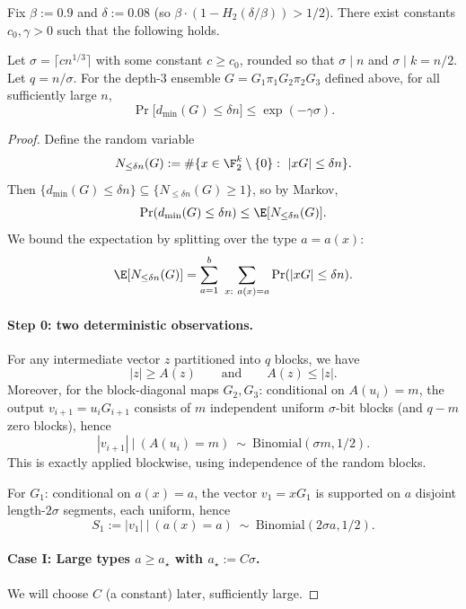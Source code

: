 \begin{theorem}[Linear distance for $t=3$, rate $1/2$]\label{thm:bd_t3_full}
Fix $\beta:=0.9$ and $\delta:=0.08$ (so $\beta\cdot(1-H_2(\delta/\beta))>1/2$).
There exist constants $c_0,\gamma>0$ such that the following holds.

Let $\sigma=\lceil c n^{1/3}\rceil$ with some constant $c\ge c_0$, rounded so that $\sigma\mid n$ and $\sigma\mid k=n/2$.
Let $q=n/\sigma$.
For the depth-$3$ ensemble $G=G_1\pi_1G_2\pi_2G_3$ defined above,
for all sufficiently large $n$,
\[
\Pr\bigl[d_{\min}(G)\le \delta n\bigr]\le \exp(-\gamma \sigma).
\]
\end{theorem}

\begin{proof}
Define the random variable
\[
N_{\le \delta n}(G):=\#\{x\in\F_2^k\setminus\{0\}:\ |xG|\le \delta n\}.
\]
Then $\{d_{\min}(G)\le \delta n\}\subseteq\{N_{\le\delta n}(G)\ge 1\}$, so by Markov,
\[
\Pr(d_{\min}(G)\le \delta n)\le \E[N_{\le\delta n}(G)].
\]
We bound the expectation by splitting over the type $a=a(x)$:
\[
\E[N_{\le\delta n}(G)]
=\sum_{a=1}^{b}\ \sum_{x:\ a(x)=a}\Pr(|xG|\le \delta n).
\]

\paragraph{Step 0: two deterministic observations.}
For any intermediate vector $z$ partitioned into $q$ blocks, we have
\[
|z|\ge A(z)\qquad\text{and}\qquad A(z)\le |z|.
\]
Moreover, for the block-diagonal maps $G_2,G_3$:
conditional on $A(u_i)=m$, the output $v_{i+1}=u_iG_{i+1}$ consists of $m$ independent uniform $\sigma$-bit blocks
(and $q-m$ zero blocks), hence
\begin{equation}\label{eq:binom-from-blocks}
|v_{i+1}|\ \big|\ (A(u_i)=m)\ \sim\ \mathrm{Binomial}(\sigma m,1/2).
\end{equation}
This is exactly  applied blockwise, using independence of the random blocks.

For $G_1$: conditional on $a(x)=a$, the vector $v_1=xG_1$ is supported on $a$ disjoint length-$2\sigma$ segments,
each uniform, hence
\begin{equation}\label{eq:S1-binom}
S_1:=|v_1|\ \big|\ (a(x)=a)\ \sim\ \mathrm{Binomial}(2\sigma a,1/2).
\end{equation}

\paragraph{Case I: Large types $a\ge a_\star$ with $a_\star:=C\sigma$.}
We will choose $C$ (a constant) later, sufficiently large.


\end{proof}
